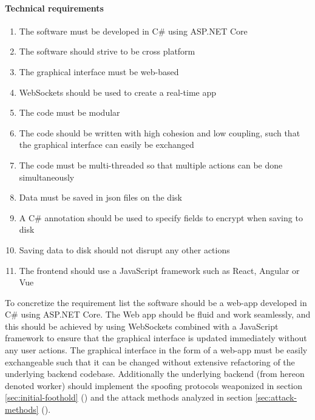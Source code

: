\documentclass{article}
\begin{document}
\paragraph{Technical requirements}
\begin{enumerate}
    \item The software must be developed in C\# using ASP.NET Core
    \item The software should strive to be cross platform
    \item The graphical interface must be web-based
    \item WebSockets should be used to create a real-time app
    \item The code must be modular
    \item The code should be written with high cohesion and low coupling, such that the graphical interface can easily be exchanged
    \item The code must be multi-threaded so that multiple actions can be done simultaneously
    \item Data must be saved in \gls{json} files on the disk
    \item A C\# annotation should be used to specify fields to encrypt when saving to disk
    \item Saving data to disk should not disrupt any other actions
    \item The frontend should use a JavaScript framework such as React, Angular or Vue
\end{enumerate}

To concretize the requirement list the software should be a web-app developed in C\# using ASP.NET Core. The Web app should be fluid and work seamlessly, and this should be achieved by using WebSockets combined with a JavaScript framework to ensure that the graphical interface is updated immediately without any user actions. The graphical interface in the form of a web-app must be easily exchangeable such that it can be changed without extensive refactoring of the underlying backend codebase. Additionally the underlying backend (from hereon denoted worker) should implement the spoofing protocols weaponized in section \ref{sec:initial-foothold} () and the attack methods analyzed in section \ref{sec:attack-methods} ().
\end{document}
